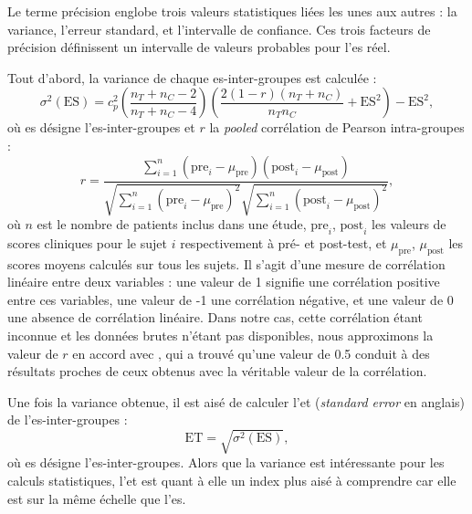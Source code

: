 Le terme précision englobe trois valeurs statistiques liées les unes aux autres : la variance, l'erreur standard, et l'intervalle de confiance.
Ces trois facteurs de précision définissent un intervalle de valeurs probables pour l'\gls{es} réel. 

Tout d'abord, la variance de chaque \gls{es}-inter-groupes est calculée \citep{Morris2008}:
\begin{equation}
\label{eq:metareview_variance_effect_size_between}
\sigma^2(\text{ES}) = c_p^2 \left (\frac{n_T + n_C - 2} {n_T + n_C - 4} \right ) \left  (\frac{2(1-r)(n_T + n_C)} {n_Tn_C} + \text{ES}^2 \right) - \text{ES}^2,
\end{equation}
où \gls{es} désigne l'\gls{es}-inter-groupes et $r$ la \textit{pooled} corrélation de Pearson intra-groupes \citep{James2013} :
\begin{equation}
\label{eq:metareview_within_group_pearson_correlation}
r = \frac{ \sum_{i=1}^{n} (\text{pre}_i - \mu_{\text{pre}})(\text{post}_i - \mu_{\text{post}}) } { \sqrt{ \sum_{i=1}^{n} (\text{pre}_i - 
\mu_{\text{pre}})^2} \sqrt{\sum_{i=1}^{n} (\text{post}_i - \mu_{\text{post}})^2} }, 
\end{equation}
où $n$ est le nombre de patients inclus dans une étude, $\text{pre}_i$, $\text{post}_i$ les valeurs de scores cliniques pour le sujet $i$ 
respectivement à pré- et post-test, et $\mu_{\text{pre}}$, $\mu_{\text{post}}$ les scores moyens calculés sur tous les sujets. 
Il s'agit d'une mesure de corrélation linéaire entre deux variables : une valeur de 1 signifie une corrélation positive entre ces variables,
une valeur de -1 une corrélation négative, et une valeur de 0 une absence de corrélation linéaire. 
Dans notre cas, cette corrélation étant inconnue et les données brutes n'étant pas disponibles, nous approximons la valeur de $r$ 
en accord avec \citet{Balk2012}, qui a trouvé qu'une valeur de 0.5 conduit à des résultats proches de ceux obtenus avec la véritable
valeur de la corrélation.

Une fois la variance obtenue, il est aisé de calculer l'\gls{et} (\textit{standard error} en anglais) de l'\gls{es}-inter-groupes 
\citep{Borenstein2009} :
\begin{equation}
\label{eq:metareview_standard_error_effect_size_between}
\text{ET} = \sqrt{\sigma^2(\text{ES})},
\end{equation}
où \gls{es} désigne l'\gls{es}-inter-groupes. Alors que la variance est intéressante pour les calculs statistiques, l'\gls{et} est quant à elle 
un index plus aisé à comprendre car elle est sur la même échelle que l'\gls{es}.

